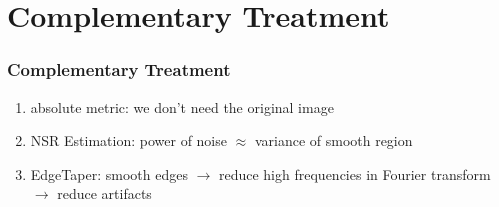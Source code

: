 \section[Compl. Treatment]{Complementary Treatment}
\begin{frame}
  \frametitle{Complementary Treatment}
  \begin{enumerate}
  \item absolute metric: we don't need the original image
  \item NSR Estimation: power of noise $\approx$ variance of smooth region
  \item EdgeTaper: smooth edges $\rightarrow$ reduce high frequencies in Fourier transform $\rightarrow$ reduce artifacts
  \end{enumerate}
\end{frame}
